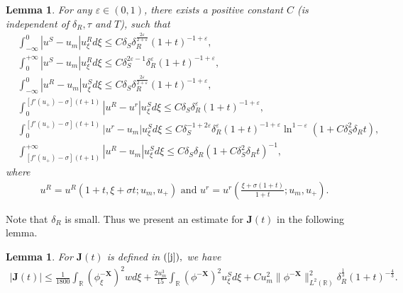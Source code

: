 \documentclass[10pt,reqno]{amsart}
\numberwithin{equation}{section}
\newtheorem{lemma}[theorem]{Lemma}
\begin{document}
	\begin{lemma}\label{WIE}
		For any $\varepsilon\in(0,1)$, there exists a positive constant $C$ (is independent of $\delta_R, \tau$ and $T$), such that
		\begin{equation} 
			\begin{aligned}
				&\int_{-\infty}^{0} |u^{S} - u_{m}|u_{\xi}^{R} d\xi \leq C\delta_{S}\delta_{R}^{\frac{2\varepsilon}{2+\varepsilon}} (1+t)^{-1+\varepsilon}, \\
				&\int_{0}^{+\infty} |u^{S} - u_{m}|u_{\xi}^{R} d\xi \leq C\delta_{S}^{2\varepsilon-1} \delta_{R}^{\varepsilon} (1+t)^{-1+\varepsilon}, \\
				&\int_{-\infty}^{0} |u^{R} - u_{m}|u_{\xi}^{S} d\xi \leq C\delta_{S}\delta_{R}^{\frac{2\varepsilon}{2+\varepsilon}} (1+t)^{-1+\varepsilon},  \\
				&\int_{0}^{[f'(u_{+}) - \sigma](t+1)} |u^{R} - u^{r}|u_{\xi}^{S} d\xi \leq C\delta_{S}\delta_{R}^{\varepsilon} (1+t)^{-1+\varepsilon},  \\
				&\int_{0}^{[f'(u_{+}) - \sigma](t+1)} |u^{r} - u_{m}|u_{\xi}^{S} d\xi \leq C\delta_{S}^{-1+2\varepsilon}\delta_{R}^{\varepsilon} (1+t)^{-1+\varepsilon} \ln^{1-\varepsilon}(1 + C\delta_{S}^{2}\delta_{R}t),  \\
				&\int_{[f'(u_{+}) - \sigma](t+1)}^{+\infty} |u^{R} - u_{m}|u_{\xi}^{S} d\xi \leq C\delta_{S}\delta_{R}(1 + C\delta_{S}^{2}\delta_{R}t)^{-1},
			\end{aligned} 
		\end{equation}
		where
		\begin{align*}
			u^{R} = u^{R}(1 + t, \xi + \sigma t; u_{m}, u_{+}) \text{ and } u^{r} = u^{r}\left( \frac{\xi + \sigma(1+t)}{1+t}; u_{m}, u_{+} \right).
		\end{align*}
	\end{lemma}
	Note that $\delta_R$ is small. Thus we present an estimate for $\mathbf{J}(t)$ in the following lemma.
	\begin{lemma}\label{J}
		For $\mathbf{J}(t)$ is defined in $(\ref{j}),$ we have
		\begin{equation}
			\begin{aligned}
				\left|\mathbf{J}(t)\right|\leq \frac{1}{1800}\int_{\mathbb{R}}(\phi_{\xi}^{-\mathbf{X}})^2wd\xi+\frac{2u_m^3}{15}\int_{\mathbb{R}}(\phi^{-\mathbf{X}})^2u_{\xi}^Sd\xi+Cu_m^2\|\phi^{-\mathbf{X}}\|_{L^2(\mathbb{R})}^2\delta_R^{\frac{1}{3}}(1+t)^{-\frac{4}{3}}.
			\end{aligned}
		\end{equation}
	\end{lemma}
\end{document}
